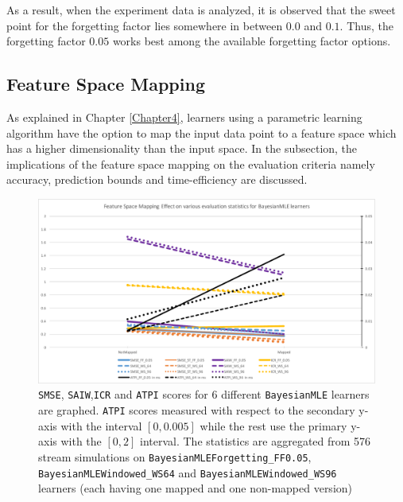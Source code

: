 As a result, when the experiment data is analyzed, it is observed that the sweet point for the forgetting factor lies somewhere in between $0.0$ and $0.1$. Thus, the forgetting factor $0.05$ works best among the available forgetting factor options.

\subsection{Feature Space Mapping}

As explained in Chapter \ref{Chapter4}, learners using a parametric learning algorithm have the option to map the input data point to a feature space which has a higher dimensionality than the input space. In the subsection, the implications of the feature space mapping on the evaluation criteria namely accuracy, prediction bounds and time-efficiency are discussed.

\begin{figure}[htbp]
  \centering
    \includegraphics[width=\linewidth]{./Figures/fsm_effect_bmle.pdf}
  \caption{\texttt{SMSE}, \texttt{SAIW},\texttt{ICR} and \texttt{ATPI} scores for 6 different \texttt{BayesianMLE} learners are graphed. \texttt{ATPI} scores measured with respect to the secondary y-axis with the interval $[0,0.005]$ while the rest use the primary y-axis with the $[0,2]$ interval. The statistics are aggregated from 576 stream simulations on \texttt{BayesianMLEForgetting\_FF0.05}, \texttt{BayesianMLEWindowed\_WS64} and \texttt{BayesianMLEWindowed\_WS96} learners (each having one mapped and one non-mapped version)}
  \label{fig:fsm_effect_bmle}
\end{figure}

